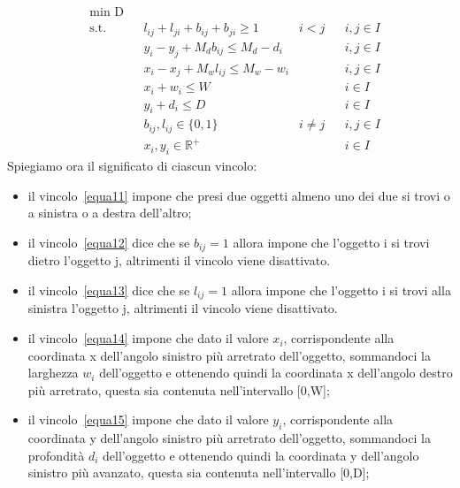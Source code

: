 \begin{align}
	& \underset{}{\text{min D}}\\
	  & \text{s.t.} &   & l_{ij} + l_{ji} + b_{ij} + b_{ji} \geq 1 & i < j    &   & i,j \in I \label{equa11} \\
	  &             &   & y_i - y_j + M_d b_{ij} \leq M_d - d_i    &          &   & i,j \in I \label{equa12} \\
	  &             &   & x_i - x_j + M_w l_{ij} \leq M_w - w_i    &          &   & i,j \in I \label{equa13} \\
	  &             &   & x_i + w_i \leq W                         &          &   & i \in I   \label{equa14} \\
	  &             &   & y_i + d_i \leq D                         &          &   & i \in I   \label{equa15} \\
	  &             &   & b_{ij}, l_{ij} \in \{0,1\}               & i \neq j &   & i,j \in I \label{equa16} \\
	  &             &   & x_{i}, y_{i} \in \mathbb{R}^{+}          &          &   & i \in I  \label{equa17}  
\end{align}
Spiegiamo ora il significato di ciascun vincolo:
\begin{itemize}
	\item il vincolo~\eqref{equa11} impone che presi due oggetti almeno uno dei due si trovi o a sinistra o a destra dell'altro;
	\item il vincolo~\eqref{equa12} dice che se $b_{ij} = 1$ allora impone che l'oggetto i si trovi dietro l'oggetto j, altrimenti il vincolo viene disattivato. 
	\item il vincolo~\eqref{equa13} dice che se $l_{ij} = 1$ allora impone che l'oggetto i si trovi alla sinistra l'oggetto j, altrimenti il vincolo viene disattivato. 
	\item il vincolo~\eqref{equa14} impone che dato il valore $x_i$, corrispondente alla coordinata x dell'angolo sinistro più arretrato dell'oggetto, sommandoci la larghezza $w_i$ dell'oggetto e ottenendo quindi la coordinata x dell'angolo destro più arretrato, questa sia contenuta nell'intervallo [0,W];
	\item il vincolo~\eqref{equa15} impone che dato il valore $y_i$, corrispondente alla coordinata y dell'angolo sinistro più arretrato dell'oggetto, sommandoci la profondità $d_i$ dell'oggetto e ottenendo quindi la coordinata y dell'angolo sinistro più avanzato, questa sia contenuta nell'intervallo [0,D];
\end{itemize}


